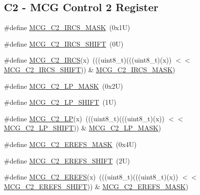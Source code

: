 \subsection*{C2 -\/ M\+CG Control 2 Register}
\begin{DoxyCompactItemize}
\item 
\#define \mbox{\hyperlink{group___m_c_g___register___masks_gaef3ef9fc35df3b7d404dd2b7279051cb}{M\+C\+G\+\_\+\+C2\+\_\+\+I\+R\+C\+S\+\_\+\+M\+A\+SK}}~(0x1\+U)
\item 
\#define \mbox{\hyperlink{group___m_c_g___register___masks_ga9a364696151f81b7a671bafd25cf16d1}{M\+C\+G\+\_\+\+C2\+\_\+\+I\+R\+C\+S\+\_\+\+S\+H\+I\+FT}}~(0\+U)
\item 
\#define \mbox{\hyperlink{group___m_c_g___register___masks_gad8f801bcc07391ec8060d0d2249a81be}{M\+C\+G\+\_\+\+C2\+\_\+\+I\+R\+CS}}(x)~(((uint8\+\_\+t)(((uint8\+\_\+t)(x)) $<$$<$ \mbox{\hyperlink{group___m_c_g___register___masks_ga9a364696151f81b7a671bafd25cf16d1}{M\+C\+G\+\_\+\+C2\+\_\+\+I\+R\+C\+S\+\_\+\+S\+H\+I\+FT}})) \& \mbox{\hyperlink{group___m_c_g___register___masks_gaef3ef9fc35df3b7d404dd2b7279051cb}{M\+C\+G\+\_\+\+C2\+\_\+\+I\+R\+C\+S\+\_\+\+M\+A\+SK}})
\item 
\#define \mbox{\hyperlink{group___m_c_g___register___masks_ga204f588f13f46a9ae20bc7aecfdf4f37}{M\+C\+G\+\_\+\+C2\+\_\+\+L\+P\+\_\+\+M\+A\+SK}}~(0x2\+U)
\item 
\#define \mbox{\hyperlink{group___m_c_g___register___masks_ga2c16a5396267a83c2059741d31c3af1a}{M\+C\+G\+\_\+\+C2\+\_\+\+L\+P\+\_\+\+S\+H\+I\+FT}}~(1\+U)
\item 
\#define \mbox{\hyperlink{group___m_c_g___register___masks_ga85aee53b6f4960d870b9f3f890c208ec}{M\+C\+G\+\_\+\+C2\+\_\+\+LP}}(x)~(((uint8\+\_\+t)(((uint8\+\_\+t)(x)) $<$$<$ \mbox{\hyperlink{group___m_c_g___register___masks_ga2c16a5396267a83c2059741d31c3af1a}{M\+C\+G\+\_\+\+C2\+\_\+\+L\+P\+\_\+\+S\+H\+I\+FT}})) \& \mbox{\hyperlink{group___m_c_g___register___masks_ga204f588f13f46a9ae20bc7aecfdf4f37}{M\+C\+G\+\_\+\+C2\+\_\+\+L\+P\+\_\+\+M\+A\+SK}})
\item 
\#define \mbox{\hyperlink{group___m_c_g___register___masks_ga2c7a64bac24e9840a1b38fd20f45ee32}{M\+C\+G\+\_\+\+C2\+\_\+\+E\+R\+E\+F\+S\+\_\+\+M\+A\+SK}}~(0x4\+U)
\item 
\#define \mbox{\hyperlink{group___m_c_g___register___masks_gaf8a3c1b95c6c95b6b86dd47ee3e8df8d}{M\+C\+G\+\_\+\+C2\+\_\+\+E\+R\+E\+F\+S\+\_\+\+S\+H\+I\+FT}}~(2\+U)
\item 
\#define \mbox{\hyperlink{group___m_c_g___register___masks_ga80da2b67760170594286bd856e76019b}{M\+C\+G\+\_\+\+C2\+\_\+\+E\+R\+E\+FS}}(x)~(((uint8\+\_\+t)(((uint8\+\_\+t)(x)) $<$$<$ \mbox{\hyperlink{group___m_c_g___register___masks_gaf8a3c1b95c6c95b6b86dd47ee3e8df8d}{M\+C\+G\+\_\+\+C2\+\_\+\+E\+R\+E\+F\+S\+\_\+\+S\+H\+I\+FT}})) \& \mbox{\hyperlink{group___m_c_g___register___masks_ga2c7a64bac24e9840a1b38fd20f45ee32}{M\+C\+G\+\_\+\+C2\+\_\+\+E\+R\+E\+F\+S\+\_\+\+M\+A\+SK}})
$$
\end{DoxyCompactItemize}
